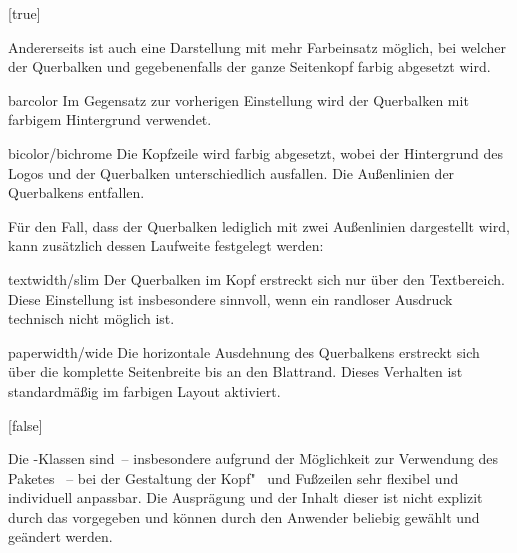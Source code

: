 \begin{Declaration*}{}
\begin{Declaration*}{}
\begin{Declaration*}{}
\begin{Declaration}[%
  v2.03;%
  v2.04!\Option{cdhead=barcolor}:nur farbig abgesetzter Querbalken;%
]{}[true]
\begin{values}{}
\end{values}
%
Andererseits ist auch eine Darstellung mit mehr Farbeinsatz möglich, bei 
welcher der Querbalken und gegebenenfalls der ganze Seitenkopf farbig 
abgesetzt wird.
%
\begin{values}{}
\item[barcolor]
   Im Gegensatz zur vorherigen Einstellung wird der 
  Querbalken mit farbigem Hintergrund verwendet.
\item[bicolor/bichrome]
   Die Kopfzeile wird farbig abgesetzt, wobei der 
  Hintergrund des Logos und der Querbalken unterschiedlich ausfallen. Die 
  Außenlinien der Querbalkens entfallen.
\end{values}
%
Für den Fall, dass der Querbalken lediglich mit zwei Außenlinien dargestellt 
wird, kann zusätzlich dessen Laufweite festgelegt werden:
%
\begin{values}{}
\item[textwidth/slim]
  Der Querbalken im Kopf erstreckt sich nur über den Textbereich. Diese 
  Einstellung ist insbesondere sinnvoll, wenn ein randloser Ausdruck technisch 
  nicht möglich ist. 
\item[paperwidth/wide]
  Die horizontale Ausdehnung des Querbalkens erstreckt sich über die komplette 
  Seitenbreite bis an den Blattrand. Dieses Verhalten ist standardmäßig im 
  farbigen Layout aktiviert.
\end{values}
\end{Declaration}

\begin{Declaration}[%
  v2.03!\Option{cdfoot=color}:farbiger Hintergrund der Fußzeile;%
  v2.03!\Option{cdfoot=\PValueName{Höhe}};%
]{}[false]%
\printdeclarationlist%
%
%
%

Die \TUDScript-Klassen sind~-- insbesondere aufgrund der Möglichkeit zur 
Verwendung des Paketes ~-- bei der Gestaltung der 
Kopf"~ und Fußzeilen sehr flexibel und individuell anpassbar. Die Ausprägung 
und der Inhalt dieser ist nicht explizit durch das \CD vorgegeben und können 
durch den Anwender beliebig gewählt und geändert werden. 


\end{Declaration}
\end{Declaration*}
\end{Declaration*}
\end{Declaration*}
